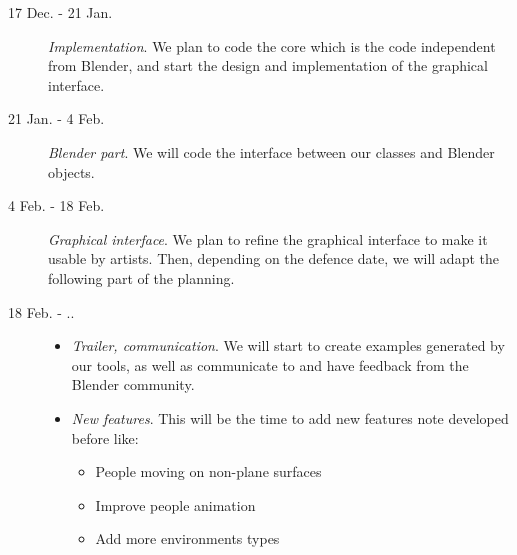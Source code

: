 \documentclass[a4paper,11pt]{article}
\begin{document}
\begin{description}
  \item[17 Dec. - 21 Jan.] \textit{Implementation}. We plan to code the core which is the code independent from Blender, and start the design and implementation of the graphical interface.
  \item[21 Jan. - 4 Feb.] \textit{Blender part}. We will code the interface between our classes and Blender objects.
  \item[4 Feb. - 18 Feb.] \textit{Graphical interface}. We plan to refine the graphical interface to make it usable by artists. Then, depending on the defence date, we will adapt the following part of the planning.
  \item[18 Feb. - ..] \begin{itemize} \item \textit{Trailer, communication}. We will start to create examples generated by our tools, as well as communicate to and have feedback from the Blender community. \item \textit{New features}.
This will be the time to add new features note developed before like:
  \begin{itemize}
    \item People moving on non-plane surfaces
    \item Improve people animation
    \item Add more environments types
  \end{itemize}
  \end{itemize}
\end{description}














\newpage
\begingroup




\endgroup
\end{document}
